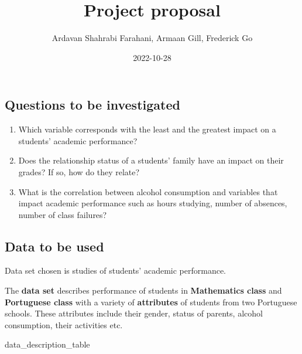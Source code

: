 \documentclass[
]{article}
\title{Project proposal}
\author{Ardavan Shahrabi Farahani, Armaan Gill, Frederick Go}
\date{2022-10-28}
\newenvironment{Shaded}{\begin{snugshade}}{\end{snugshade}}
\newcommand{\NormalTok}[1]{#1}
\providecommand{\tightlist}{%
  \setlength{\itemsep}{0pt}\setlength{\parskip}{0pt}}
\begin{document}
\maketitle

\hypertarget{questions-to-be-investigated}{%
\subsection{Questions to be
investigated}\label{questions-to-be-investigated}}

\begin{enumerate}
\def\labelenumi{\arabic{enumi}.}
\tightlist
\item
  Which variable corresponds with the least and the greatest impact on a
  students' academic performance?
\item
  Does the relationship status of a students' family have an impact on
  their grades? If so, how do they relate?
\item
  What is the correlation between alcohol consumption and variables that
  impact academic performance such as hours studying, number of
  absences, number of class failures?
\end{enumerate}

\hypertarget{data-to-be-used}{%
\subsection{Data to be used}\label{data-to-be-used}}

Data set chosen is studies of students' academic performance.

The \textbf{data set} describes performance of students in
\textbf{Mathematics class} and \textbf{Portuguese class} with a variety
of \textbf{attributes} of students from two Portuguese schools. These
attributes include their gender, status of parents, alcohol consumption,
their activities etc.

\begin{Shaded}
\begin{Highlighting}[]
\NormalTok{data\_description\_table}
\end{Highlighting}
\end{Shaded}
\end{document}
